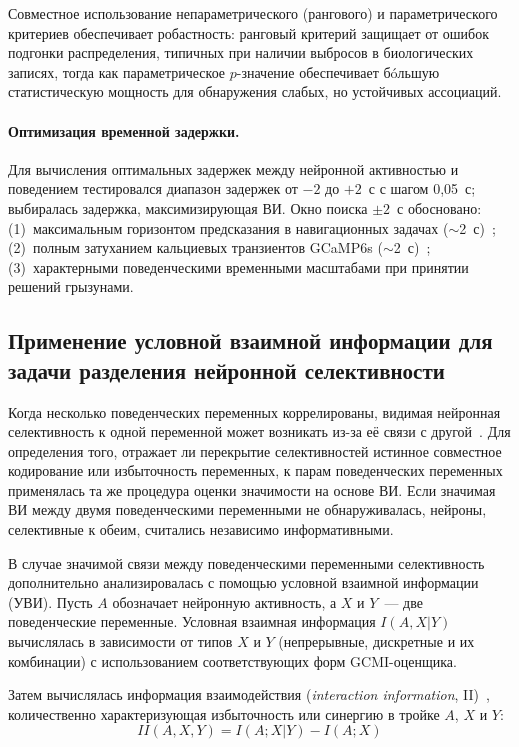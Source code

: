 Совместное использование непараметрического (рангового) и параметрического критериев обеспечивает робастность: ранговый критерий защищает от ошибок подгонки распределения, типичных при наличии выбросов в биологических записях, тогда как параметрическое $p$-значение обеспечивает бóльшую статистическую мощность для обнаружения слабых, но устойчивых ассоциаций.

\paragraph{Оптимизация временной задержки.}

Для вычисления оптимальных задержек между нейронной активностью и поведением тестировался диапазон задержек от $-2$ до $+2$~с с шагом 0{,}05~с; выбиралась задержка, максимизирующая ВИ. Окно поиска $\pm 2$~с обосновано: (1)~максимальным горизонтом предсказания в навигационных задачах ($\sim$2~с)~\cite{Lian2022}; (2)~полным затуханием кальциевых транзиентов GCaMP6s ($\sim$2~с)~\cite{Zhang2023}; (3)~характерными поведенческими временными масштабами при принятии решений грызунами.


\subsection{Применение условной взаимной информации для задачи разделения нейронной селективности}\label{sec:intense_disentangle}

Когда несколько поведенческих переменных коррелированы, видимая нейронная селективность к одной переменной может возникать из-за её связи с другой~\cite{mix,mix3}. Для определения того, отражает ли перекрытие селективностей истинное совместное кодирование или избыточность переменных, к парам поведенческих переменных применялась та же процедура оценки значимости на основе ВИ. Если значимая ВИ между двумя поведенческими переменными не обнаруживалась, нейроны, селективные к обеим, считались независимо информативными.

В случае значимой связи между поведенческими переменными селективность дополнительно анализировалась с помощью условной взаимной информации (УВИ). Пусть $A$ обозначает нейронную активность, а $X$ и $Y$~--- две поведенческие переменные. Условная взаимная информация $I(A,X|Y)$ вычислялась в зависимости от типов $X$ и $Y$ (непрерывные, дискретные и их комбинации) с использованием соответствующих форм GCMI-оценщика.

Затем вычислялась информация взаимодействия (\textit{interaction information}, II)~\cite{McGill1954,ghassami2017}, количественно характеризующая избыточность или синергию в тройке $A$, $X$ и $Y$:
$$II(A,X,Y) = I(A;X|Y) - I(A;X)$$

